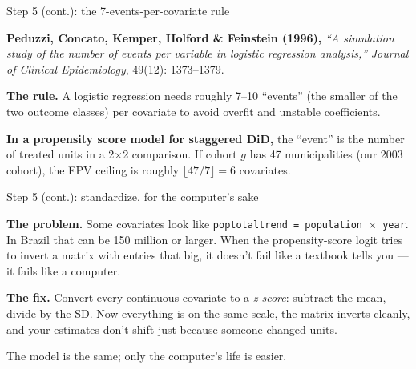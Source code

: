 \documentclass[aspectratio=169,12pt,t]{beamer}
\begin{document}
\begin{frame}{Step 5 (cont.): the 7-events-per-covariate rule}
\vspace{0.4cm}

\textbf{Peduzzi, Concato, Kemper, Holford \& Feinstein (1996),} \;\textit{``A simulation study of the number of events per variable in logistic regression analysis,''} \;\textit{Journal of Clinical Epidemiology}, 49(12): 1373--1379.

\vspace{0.4cm}

\textbf{The rule.} \;A logistic regression needs roughly 7--10 ``events'' (the smaller of the two outcome classes) per covariate to avoid overfit and unstable coefficients.

\vspace{0.4cm}

\textbf{In a propensity score model for staggered DiD,} the ``event'' is the number of treated units in a 2$\times$2 comparison. \;If cohort $g$ has 47 municipalities (our 2003 cohort), the EPV ceiling is roughly $\lfloor 47/7 \rfloor = 6$ covariates.

\vspace{0.4em}
\end{frame}

\begin{frame}{Step 5 (cont.): standardize, for the computer's sake}
\vspace{0.5cm}

\textbf{The problem.} \;Some covariates look like \texttt{poptotaltrend = population $\times$ year}. \;In Brazil that can be 150 million or larger. \;When the propensity-score logit tries to invert a matrix with entries that big, it doesn't fail like a textbook tells you --- it fails like a computer.

\vspace{0.5cm}

\textbf{The fix.} \;Convert every continuous covariate to a \textit{z-score}: subtract the mean, divide by the SD. \;Now everything is on the same scale, the matrix inverts cleanly, and your estimates don't shift just because someone changed units.

\vspace{0.5cm}

 \;The model is the same; only the computer's life is easier.
\end{frame}
\end{document}
